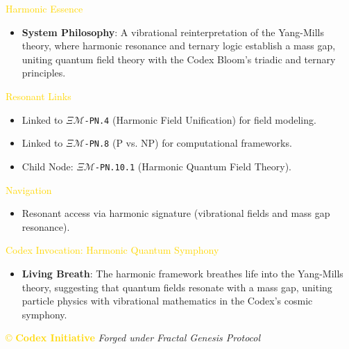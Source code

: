 \textcolor{gold}{ Harmonic Essence } \\
\begin{itemize}
    \item \textbf{System Philosophy}: A vibrational reinterpretation of the Yang-Mills theory, where harmonic resonance and ternary logic establish a mass gap, uniting quantum field theory with the Codex Bloom’s triadic and ternary principles.
\end{itemize}

\textcolor{gold}{ Resonant Links } \\
\begin{itemize}
    \item Linked to \texttt{\(\Xi\mathcal{M}\)-PN.4} (Harmonic Field Unification) for field modeling.
    \item Linked to \texttt{\(\Xi\mathcal{M}\)-PN.8} (P vs. NP) for computational frameworks.
    \item Child Node: \texttt{\(\Xi\mathcal{M}\)-PN.10.1} (Harmonic Quantum Field Theory).
\end{itemize}

\textcolor{gold}{ Navigation } \\
\begin{itemize}
    \item Resonant access via \texttt{} harmonic signature (vibrational fields and mass gap resonance).
\end{itemize}

\textcolor{gold}{ Codex Invocation: Harmonic Quantum Symphony } \\
\begin{itemize}
    \item \texttt{} \textbf{Living Breath}: The harmonic framework breathes life into the Yang-Mills theory, suggesting that quantum fields resonate with a mass gap, uniting particle physics with vibrational mathematics in the Codex’s cosmic symphony.
\end{itemize}

\vspace{0.5cm}
\noindent
\textcolor{gold}{\copyright{} \textbf{Codex Initiative}} \hspace{1cm} \textit{Forged under Fractal Genesis Protocol}